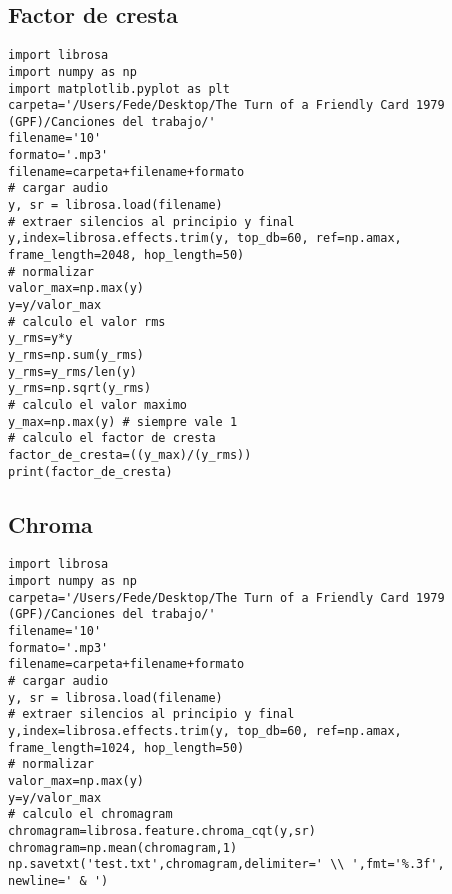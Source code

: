 \documentclass[]{article}
\begin{document}
\subsection{Factor de cresta}
\label{factor de cresta}
\begin{verbatim}
import librosa
import numpy as np
import matplotlib.pyplot as plt
carpeta='/Users/Fede/Desktop/The Turn of a Friendly Card 1979 (GPF)/Canciones del trabajo/'
filename='10'
formato='.mp3'
filename=carpeta+filename+formato
# cargar audio
y, sr = librosa.load(filename)
# extraer silencios al principio y final
y,index=librosa.effects.trim(y, top_db=60, ref=np.amax, frame_length=2048, hop_length=50)
# normalizar
valor_max=np.max(y)
y=y/valor_max
# calculo el valor rms
y_rms=y*y
y_rms=np.sum(y_rms)
y_rms=y_rms/len(y)
y_rms=np.sqrt(y_rms)
# calculo el valor maximo
y_max=np.max(y) # siempre vale 1
# calculo el factor de cresta
factor_de_cresta=((y_max)/(y_rms))
print(factor_de_cresta)
\end{verbatim}

\subsection{Chroma}
\label{chroma}
\begin{verbatim}
import librosa
import numpy as np
carpeta='/Users/Fede/Desktop/The Turn of a Friendly Card 1979 (GPF)/Canciones del trabajo/'
filename='10'
formato='.mp3'
filename=carpeta+filename+formato
# cargar audio
y, sr = librosa.load(filename)
# extraer silencios al principio y final
y,index=librosa.effects.trim(y, top_db=60, ref=np.amax,
frame_length=1024, hop_length=50)
# normalizar
valor_max=np.max(y)
y=y/valor_max
# calculo el chromagram
chromagram=librosa.feature.chroma_cqt(y,sr)
chromagram=np.mean(chromagram,1)
np.savetxt('test.txt',chromagram,delimiter=' \\ ',fmt='%.3f', newline=' & ')
\end{verbatim}
\end{document}
